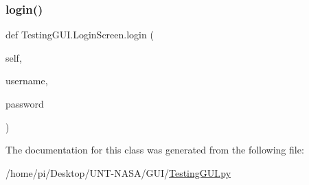 \subsubsection{\texorpdfstring{login()}{login()}\hspace{0.1cm}{\footnotesize\ttfamily [2/2]}}
{\footnotesize\ttfamily def Testing\+G\+U\+I.\+Login\+Screen.\+login (\begin{DoxyParamCaption}\item[{}]{self,  }\item[{}]{username,  }\item[{}]{password }\end{DoxyParamCaption})}



The documentation for this class was generated from the following file\+:\begin{DoxyCompactItemize}
\item 
/home/pi/\+Desktop/\+U\+N\+T-\/\+N\+A\+S\+A/\+G\+U\+I/\hyperlink{GUI_2TestingGUI_8py}{Testing\+G\+U\+I.\+py}\end{DoxyCompactItemize}
